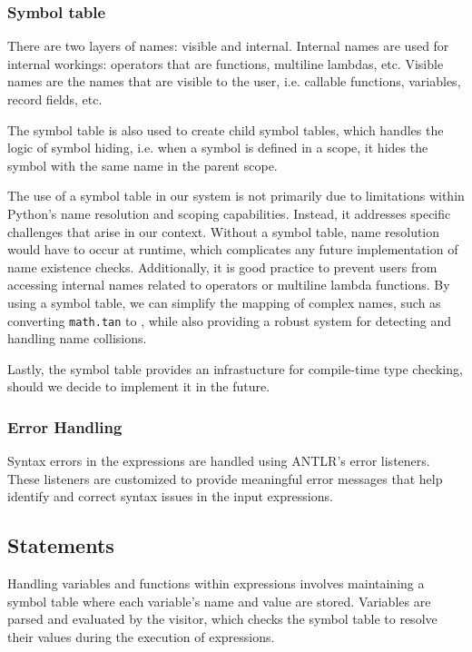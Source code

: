 \subsubsection{Symbol table}

There are two layers of names: visible and internal. Internal names are used for internal workings: operators that are functions, multiline lambdas, etc. Visible names are the names that are visible to the user, i.e. callable functions, variables, record fields, etc.

The symbol table is also used to create child symbol tables, which handles the logic of symbol hiding, i.e. when a symbol is defined in a scope, it hides the symbol with the same name in the parent scope.

The use of a symbol table in our system is not primarily due to limitations within Python’s name resolution and scoping capabilities. Instead, it addresses specific challenges that arise in our context. Without a symbol table, name resolution would have to occur at runtime, which complicates any future implementation of name existence checks. Additionally, it is good practice to prevent users from accessing internal names related to operators or multiline lambda functions. By using a symbol table, we can simplify the mapping of complex names, such as converting \texttt{math.tan} to , while also providing a robust system for detecting and handling name collisions.

Lastly, the symbol table provides an infrastucture for compile-time type checking, should we decide to implement it in the future.

\subsubsection{Error Handling}

Syntax errors in the expressions are handled using ANTLR's error listeners. These listeners are customized to provide meaningful error messages that help identify and correct syntax issues in the input expressions.

\subsection{Statements}

Handling variables and functions within expressions involves maintaining a symbol table where each variable's name and value are stored. Variables are parsed and evaluated by the visitor, which checks the symbol table to resolve their values during the execution of expressions.

